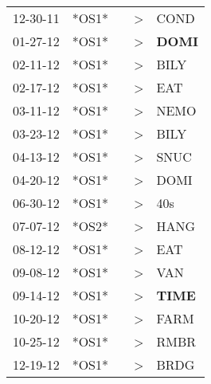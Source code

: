 \begin{supertabular}{p{0.07\textwidth}p{0.06\textwidth}p{0.02\textwidth}p{0.02\textwidth}p{0.06\textwidth}}
 12-30-11\textsuperscript{} &                   *OS1* &    &     \textgreater &           COND\textsuperscript{} \\
 01-27-12\textsuperscript{} &                   *OS1* &    &     \textgreater &  \textbf{DOMI\textsuperscript{}} \\
 02-11-12\textsuperscript{} &                   *OS1* &    &     \textgreater &           BILY\textsuperscript{} \\
 02-17-12\textsuperscript{} &                   *OS1* &    &     \textgreater &            EAT\textsuperscript{} \\
 03-11-12\textsuperscript{} &                   *OS1* &    &     \textgreater &           NEMO\textsuperscript{} \\
 03-23-12\textsuperscript{} &                   *OS1* &    &     \textgreater &           BILY\textsuperscript{} \\
 04-13-12\textsuperscript{} &                   *OS1* &    &     \textgreater &           SNUC\textsuperscript{} \\
 04-20-12\textsuperscript{} &                   *OS1* &    &     \textgreater &           DOMI\textsuperscript{} \\
 06-30-12\textsuperscript{} &                   *OS1* &    &     \textgreater &            40s\textsuperscript{} \\
 07-07-12\textsuperscript{} &                   *OS2* &    &     \textgreater &           HANG\textsuperscript{} \\
 08-12-12\textsuperscript{} &                   *OS1* &    &     \textgreater &            EAT\textsuperscript{} \\
 09-08-12\textsuperscript{} &                   *OS1* &    &     \textgreater &            VAN\textsuperscript{} \\
 09-14-12\textsuperscript{} &                   *OS1* &    &     \textgreater &  \textbf{TIME\textsuperscript{}} \\
 10-20-12\textsuperscript{} &                   *OS1* &    &     \textgreater &           FARM\textsuperscript{} \\
 10-25-12\textsuperscript{} &                   *OS1* &    &     \textgreater &           RMBR\textsuperscript{} \\
 12-19-12\textsuperscript{} &                   *OS1* &    &     \textgreater &           BRDG\textsuperscript{} \\

\end{supertabular}
